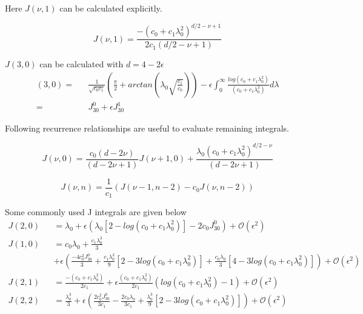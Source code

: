 \documentclass{article}
\newcommand{\beq}{\begin{equation}}
\newcommand{\eeq}{\end{equation}}
\newcommand{\bea}{\begin{eqnarray}}
\newcommand{\eea}{\end{eqnarray}}
\begin{document}
\vspace{2mm}
Here $ J\left( \nu ,1 \right) $ can be calculated explicitly.

$$ J\left( \nu,1 \right) =  \frac{-\left( c_0 + c_1 \lambda_0^2 \right)^{d/2-\nu +1}}{2c_1 \left(d/2-\nu+1\right)}$$

\vspace{5mm}
$  J\left( 3,0 \right)$ can be calculated with $d=4-2\epsilon$
\bea
\left( 3,0 \right) =&& \frac{1}{\sqrt{c_0 c_1}} \left( \frac{\pi}{2} + arctan \left( \lambda_0 \sqrt{\frac{c_1}{c_0}}\right) \right)    - \epsilon \int_{0}^{\infty} \frac{ log \left( c_0 + c_1 \lambda_0^2 \right)}{\left( c_0 + c_1 \lambda_0^2   \right)}   d\lambda 
\nonumber\\
= &&J_{30}^0 +\epsilon J_{30}^1
\eea

Following recurrence relationships are useful to evaluate remaining integrals.

\beq 
 J\left( \nu,0 \right) = \frac{c_0 \left(d-2\nu \right)}{\left(d-2\nu+1\right)} J\left( \nu+1, 0\right) + \frac{\lambda_0 \left( c_0 + c_1 \lambda_0^2 \right)^{d/2-\nu}}{\left(d-2\nu+1\right)} 
\eeq

\beq 
J\left( \nu,n \right) = \frac{1}{c_1} \left( J\left( \nu-1,n-2 \right)-c_0 J\left( \nu,n-2 \right) \right) 
\eeq


\vspace{5mm}
Some commonly used J integrals are given below
\bea
		J\left( 2,0 \right) &&= \lambda_0 +\epsilon \left( \lambda_0 \left[ 2-log \left( c_0 + c_1 \lambda_0^2 \right)  \right] -2c_0 J_{30}^0 \right) + \mathcal{O} \left( \epsilon^2 \right)   \\
		J\left( 1,0 \right) &&= c_0 \lambda_0 + \frac{c_1 \lambda_0^3}{3}  \\
		&& +\epsilon \left(    \frac{-4c_0^2 J_{30}^0}{3}      +   \frac{c_1\lambda_0^3}{9} \left[ 2-3log \left( c_0 + c_1 \lambda_0^2 \right)  \right]     +     \frac{c_0\lambda_0}{3} \left[4-3log \left( c_0 + c_1 \lambda_0^2 \right)  \right]            \right) + \mathcal{O} \left( \epsilon^2 \right)	\nonumber\\
		J\left( 2,1 \right) &&= \frac{- \left( c_0 +c_1 \lambda_0^2 \right) }{2c_1} +\epsilon \frac{ \left( c_0 +c_1 \lambda_0^2 \right) }{2c_1} \left(  log \left( c_0 +c_1 \lambda_0^2 \right) -1 \right) + \mathcal{O} \left( \epsilon^2 \right) \\
		J\left( 2,2 \right) &&=  \frac{\lambda_0^3}{3} 
		+\epsilon \left(    \frac{2c_0^2 J_{30}^0}{3c_1}   -\frac{2c_0 \lambda_0 }{3c_1}      + \frac{\lambda_0^3}{9} \left[ 2-3log \left( c_0 + c_1 \lambda_0^2 \right)  \right]         \right) + \mathcal{O} \left( \epsilon^2 \right)	
\eea
\end{document}
